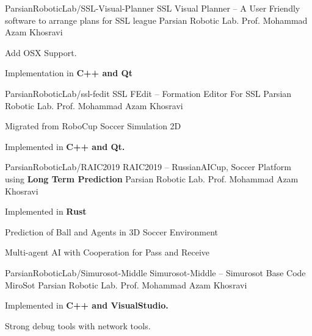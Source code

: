
\begin{cventries}
  \cventry
    {ParsianRoboticLab/SSL-Visual-Planner} %
    {SSL Visual Planner -- A User Friendly software to arrange plans for SSL league} %
    {Parsian Robotic Lab.} %
    {Prof. Mohammad Azam Khosravi} %
    {
      \begin{cvitems} %
        \item {Add OSX Support.}
        \item {Implementation in \textbf{C++ and Qt}}
      \end{cvitems}
    }

  \cventry
    {ParsianRoboticLab/ssl-fedit} %
    {SSL FEdit -- Formation Editor For SSL} %
    {Parsian Robotic Lab.} %
    {Prof. Mohammad Azam Khosravi} %
    {
      \begin{cvitems} %
        \item {Migrated from RoboCup Soccer Simulation 2D}
        \item {Implemented in \textbf{C++ and Qt.}}
      \end{cvitems}
    }

  \cventry
    {ParsianRoboticLab/RAIC2019} %
    {RAIC2019 -- RussianAICup, Soccer Platform using \textbf{Long Term Prediction}} %
    {Parsian Robotic Lab.} %
    {Prof. Mohammad Azam Khosravi} %
    {
      \begin{cvitems} %
        \item {Implemented in \textbf{Rust}}
        \item {Prediction of Ball and Agents in 3D Soccer Environment}
        \item {Multi-agent AI with Cooperation for Pass and Receive}
      \end{cvitems}
    }

  \cventry
    {ParsianRoboticLab/Simurosot-Middle} %
    {Simurosot-Middle -- Simurosot Base Code MiroSot} %
    {Parsian Robotic Lab.} %
    {Prof. Mohammad Azam Khosravi} %
    {
      \begin{cvitems} %
        \item {Implemented in \textbf{C++ and VisualStudio.}}
        \item {Strong debug tools with network tools.}
      \end{cvitems}
    }
    

\end{cventries}
